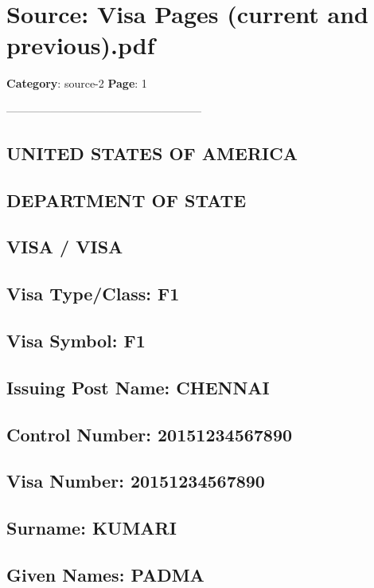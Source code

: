 \section*{Source: Visa Pages (current and previous).pdf}
\textbf{Category}: source-2
\textbf{Page}: 1

-----------------------------------------------------

\subsection*{UNITED STATES OF AMERICA}

\subsection*{DEPARTMENT OF STATE}

\subsection*{VISA / VISA}

\subsection*{Visa Type/Class: F1}

\subsection*{Visa Symbol: F1}

\subsection*{Issuing Post Name: CHENNAI}

\subsection*{Control Number: 20151234567890}

\subsection*{Visa Number: 20151234567890}

\subsection*{Surname: KUMARI}

\subsection*{Given Names: PADMA}

